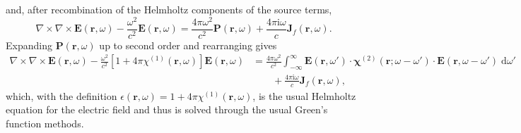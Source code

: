 and, after recombination of the Helmholtz components of the source terms,
\begin{equation}
\nabla\times\nabla\times\mathbf{E}(\mathbf{r},\omega) - \frac{\omega^2}{c^2}\mathbf{E}(\mathbf{r},\omega) = \frac{4\pi\omega^2}{c^2}\mathbf{P}(\mathbf{r},\omega) + \frac{4\pi\mathrm{i}\omega}{c}\mathbf{J}_f(\mathbf{r},\omega).
\end{equation}
Expanding $\mathbf{P}(\mathbf{r},\omega)$ up to second order and rearranging gives
\begin{equation}
\begin{split}
\nabla\times\nabla\times\mathbf{E}(\mathbf{r},\omega) - \frac{\omega^2}{c^2}\left[1 + 4\pi\chi^{(1)}(\mathbf{r},\omega)\right]\mathbf{E}(\mathbf{r},\omega) &= \frac{4\pi\omega^2}{c^2}\int_{-\infty}^\infty\mathbf{E}(\mathbf{r},\omega')\cdot\bm{\chi}^{(2)}(\mathbf{r};\omega - \omega')\cdot\mathbf{E}(\mathbf{r},\omega - \omega')\;\mathrm{d}\omega'\\
&\qquad + \frac{4\pi\mathrm{i}\omega}{c}\mathbf{J}_f(\mathbf{r},\omega),
\end{split}
\end{equation}
which, with the definition $\epsilon(\mathbf{r},\omega) = 1 + 4\pi\chi^{(1)}(\mathbf{r},\omega)$, is the usual Helmholtz equation for the electric field and thus is solved through the usual Green's function methods.
